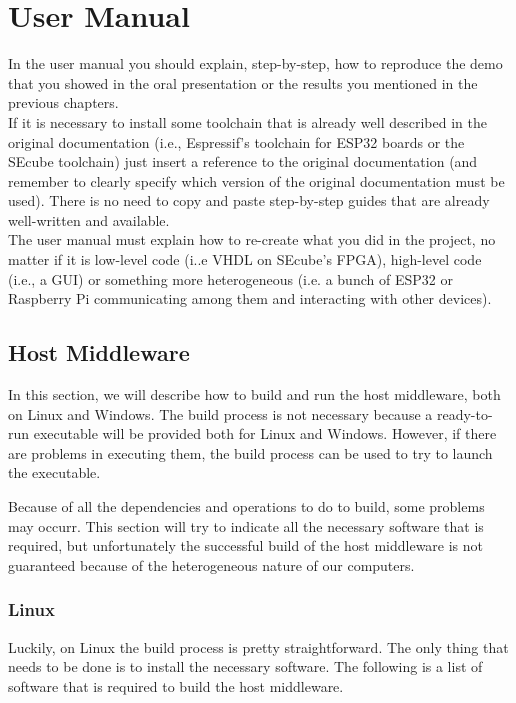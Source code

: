 \chapter{User Manual}
\label{usermanual}


In the user manual you should explain, step-by-step, how to reproduce the demo that you showed in the oral presentation or the results you mentioned in the previous chapters.\\ If it is necessary to install some toolchain that is already well described in the original documentation (i.e., Espressif's toolchain for ESP32 boards or the SEcube toolchain) just insert a reference to the original documentation (and remember to clearly specify which version of the original documentation must be used). There is no need to copy and paste step-by-step guides that are already well-written and available.\\The user manual must explain how to re-create what you did in the project, no matter if it is low-level code (i..e VHDL on SEcube's FPGA), high-level code (i.e., a GUI) or something more heterogeneous (i.e. a bunch of ESP32 or Raspberry Pi communicating among them and interacting with other devices).  

\section{Host Middleware}

In this section, we will describe how to build and run the host middleware, both on Linux and Windows. The build process is not necessary because a ready-to-run executable will be provided both for Linux and Windows. However, if there are problems in executing them, the build process can be used to try to launch the executable. 

\begin{warning}
Because of all the dependencies and operations to do to build, some problems may occurr. This section will try to indicate all the necessary software that is required, but unfortunately the successful build of the host middleware is not guaranteed because of the heterogeneous nature of our computers.
\end{warning}

\subsection{Linux}
Luckily, on Linux the build process is pretty straightforward. The only thing that needs to be done is to install the necessary software. The following is a list of software that is required to build the host middleware.

